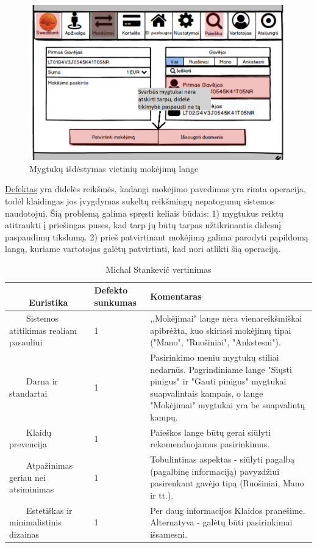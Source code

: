 \documentclass[oneside]{VUMIFPSkursinis}
\begin{document}
\begin{figure}[H]
	\includegraphics[scale=0.55]{MokejimoPatvirtinimasKlaiduPrevencija.png}
  \caption{Mygtukų išdėstymas vietinių mokėjimų lange}
	\label{fig:klaiduPrevencijaMygtukai}
\end{figure}
\hyperref[lentele:klaiduPrevencijaJ]{Defektas} yra didelės reikšmės, kadangi mokėjimo pavedimas yra rimta operacija, todėl klaidingas jos įvygdymas sukeltų reikšmingų nepatogumų sistemos naudotojui. Šią problemą galima spręsti keliais būdais: 1) mygtukus reiktų atitraukti į priešingas puses, kad tarp jų būtų tarpas užtikrinantis didesnį paspaudimų tikslumą. 2) prieš patvirtinant mokėjimą galima parodyti papildomą langą, kuriame vartotojas galėtų patvirtinti, kad nori atlikti šią operaciją.
\begin{center}
	\begin{longtable}[!htb]{|p{3.5cm}|p{1.9cm}|p{9.6cm}|}
	\caption{Michal Stankevič vertinimas}
	\endfirsthead
    \endhead
  \hline
    Euristika & Defekto sunkumas & Komentaras \\ \hline
    Sistemos atitikimas realiam pasauliui & 1 & ,,Mokėjimai" lange nėra vienareikšmiškai apibrėžta, kuo skiriasi mokėjimų tipai ("Mano", "Ruošiniai", "Ankstesni").\\ \hline
    Darna ir standartai & 1 & Pasirinkimo meniu mygtukų stiliai nedarnūs. Pagrindiniame lange "Siųsti pinigus" ir "Gauti pinigus" mygtukai suapvalintais kampais, o lange "Mokėjimai" mygtukai yra be suapvalintų kampų. \\ \hline
    Klaidų prevencija & 1 & Paieškos lange būtų gerai siūlyti rekomenduojamus pasirinkimus. \\ \hline
    Atpažinimas geriau nei atsiminimas & 1 & Tobulintinas aspektas - siūlyti pagalbą (pagalbinę informaciją) pavyzdžiui pasirenkant gavėjo tipą (Ruošiniai, Mano ir tt.).\\ \hline
    Estetiškas ir minimalistinis dizainas & 1 & Per daug informacijos Klaidos pranešime. Alternatyva - galėtų būti pasirinkimai išsamesni. \\ \hline
	\end{longtable}
\end{center}
\end{document}
